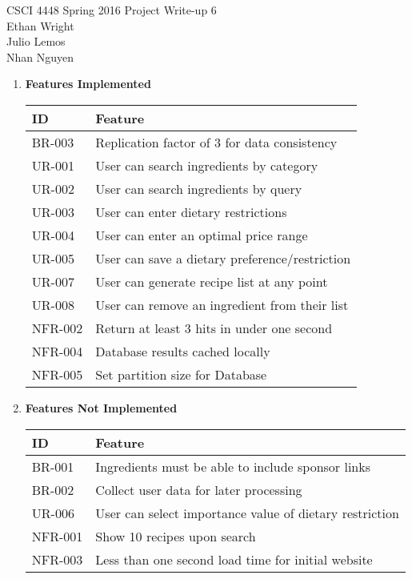 \documentclass[12pt]{article}
\begin{document}
CSCI 4448 Spring 2016 \hfill Project Write-up 6\\
Ethan Wright \\
Julio Lemos \\
Nhan Nguyen \\

\hrulefill
\begin{enumerate}
  \item \textbf{Features Implemented} 
    \vspace{1cm}
    \\     
    \begin{tabular}{| l | l | } 
      \hline
      \textbf{ID} & \textbf{Feature}  \\ \hline
      BR-003 & Replication factor of 3 for data consistency \\ \hline
      UR-001 & User can search ingredients by category \\ \hline
      UR-002 & User can search ingredients by query \\ \hline
      UR-003 & User can enter dietary restrictions \\ \hline
      UR-004 & User can enter an optimal price range \\ \hline
      UR-005 & User can save a dietary preference/restriction \\ \hline
      UR-007 & User can generate recipe list at any point \\ \hline
      UR-008 & User can remove an ingredient from their list \\ \hline
      NFR-002 & Return at least 3 hits in under one second \\ \hline
      NFR-004 & Database results cached locally \\ \hline
      NFR-005 & Set partition size for Database \\ \hline
    \end{tabular}

  \newpage
  \item \textbf{Features Not Implemented}
    \vspace{1cm}
    \\
    \begin{tabular}{| l | l |}
      \hline
      \textbf{ID} & \textbf{Feature} \\ \hline
      BR-001 & Ingredients must be able to include sponsor links \\ \hline
      BR-002 & Collect user data for later processing \\ \hline
      UR-006 & User can select importance value of dietary restriction \\ \hline
      NFR-001 & Show 10 recipes upon search \\ \hline
      NFR-003 & Less than one second load time for initial website \\ \hline
    \end{tabular}


\end{enumerate}
\end{document}
